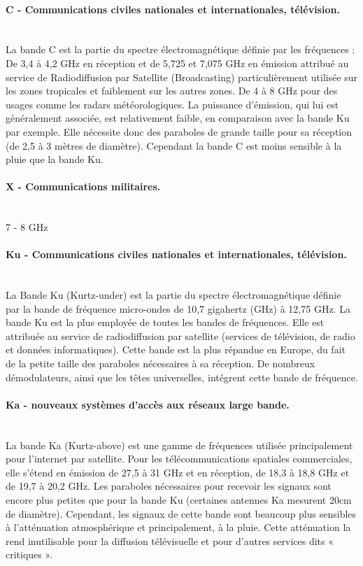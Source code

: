        \paragraph{C - Communications civiles nationales et internationales, télévision.}~\\
            La bande C est la partie du spectre électromagnétique définie par les fréquences :
                De 3,4 à 4,2 GHz en réception et de 5,725 et 7,075 GHz en émission attribué au service de Radiodiffusion par Satellite (Broadcasting) particulièrement utilisée sur les zones tropicales et faiblement sur les autres zones.
                De 4 à 8 GHz pour des usages comme les radars météorologiques.
            La puissance d'émission, qui lui est généralement associée, est relativement faible, en comparaison avec la bande Ku par exemple. Elle nécessite donc des paraboles de grande taille pour sa réception (de 2,5 à 3 mètres de diamètre). Cependant la bande C est moins sensible à la pluie que la bande Ku.

        \paragraph{X - Communications militaires.}~\\
        7  - 8 GHz  

        \paragraph{Ku - Communications civiles nationales et internationales, télévision.}~\\
            La Bande Ku (Kurtz-under) est la partie du spectre électromagnétique définie par la bande de fréquence micro-ondes de 10,7 gigahertz (GHz) à 12,75 GHz. La bande Ku est la plus employée de toutes les bandes de fréquences.
            Elle est attribuée au service de radiodiffusion par satellite (services de télévision, de radio et données informatiques). Cette bande est la plus répandue en Europe, du fait de la petite taille des paraboles nécessaires à sa réception.
            De nombreux démodulateurs, ainsi que les têtes universelles, intégrent cette bande de fréquence.
                        
        \paragraph{Ka - nouveaux systèmes d’accès aux réseaux large bande.}~\\
            La bande Ka (Kurtz-above) est une gamme de fréquences utilisée principalement pour l’internet par satellite. Pour les télécommunications spatiales commerciales, elle s’étend en émission de 27,5 à 31 GHz et en réception, de 18,3 à 18,8 GHz et de 19,7 à 20,2 GHz. Les paraboles nécessaires pour recevoir les signaux sont encore plus petites que pour la bande Ku (certaines antennes Ka mesurent 20cm de diamètre). Cependant, les signaux de cette bande sont beaucoup plus sensibles à l’atténuation atmosphérique et principalement, à la pluie. Cette atténuation la rend inutilisable pour la diffusion télévisuelle et pour d’autres services dits « critiques ».

